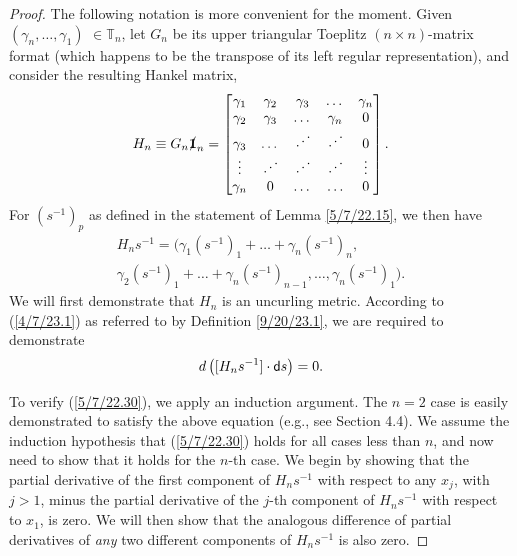 \documentclass{amsart}
\numberwithin{equation}{section}
\theoremstyle{definition}
\numberwithin{theorem}{section}
\begin{document}
\enlargethispage{1cm}
\begin{proof} The following notation is more convenient for the moment.  Given $(\gamma_n,\dots,\gamma_1)$ $\in \mathbb{T}_n$, let $G_n$ be its upper triangular Toeplitz $(n\times n)$-matrix format (which happens to be the transpose of its left regular representation), and consider the resulting Hankel matrix, 
\begin{equation}\label{5/7/22.20} H_n \equiv G_n \slashed{\bf 1}_n = \begin{bmatrix} \gamma_1 & \gamma_2 & \gamma_3 & \dots & \gamma_n \\ \gamma_2 & \gamma_3 & \dots & \gamma_n & 0 \\ \gamma_3 & \dots & \iddots & \iddots & 0  \\ \vdots & \iddots & \iddots & \iddots & \vdots \\ \gamma_n & 0 & \dots & \ldots & 0 \end{bmatrix}.\end{equation}
For $\left( s^{-1} \right)_p$ as defined in the statement of Lemma \ref{5/7/22.15}, we then have
\begin{multline}  H_n s^{-1}   =  \Big( \gamma_1\left( s^{-1} \right)_1  + \dots + \gamma_n \left( s^{-1} \right)_n, \\ \gamma_2\left( s^{-1} \right)_1  + \dots + \gamma_n \left( s^{-1} \right)_{n-1}, 
  \dots , 
 \gamma_n \left( s^{-1} \right)_1 \Big). \label{5/7/22.40}
\end{multline}
 We will first demonstrate that $H_n$ is an uncurling metric.  According to (\ref{4/7/23.1}) as referred to by Definition \ref{9/20/23.1}, we are required to demonstrate 
\begin{equation}\label{5/7/22.30} d\left([H_n s^{-1}]\cdot {\sf d}s\right) = 0.\end{equation}  

To verify (\ref{5/7/22.30}), we apply an induction argument.  The $n=2$ case is easily demonstrated to satisfy the above equation (e.g., see Section 4.4).  We assume the induction hypothesis that (\ref{5/7/22.30}) holds for all cases less than $n$, and now need to show that it holds for the $n$-th case.  
We begin by showing that the partial derivative of the first component of $H_n s^{-1}$ with respect to any $x_j$, with $j>1$, minus the partial derivative of the $j$-th component of $H_n s^{-1}$ with respect to $x_1$, is zero. We will then show that the analogous difference of partial derivatives of {\it any} two different components of $H_ns^{-1}$ is also zero.


\end{proof}
\end{document}
